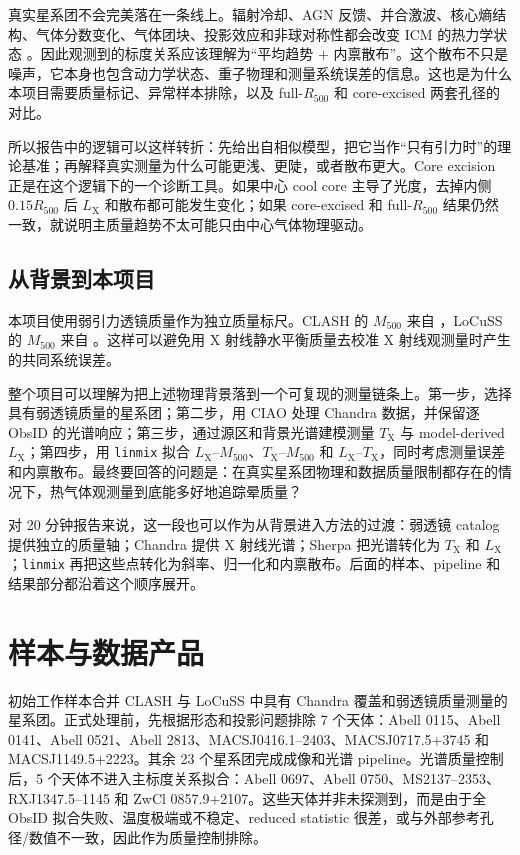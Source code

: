 \documentclass[UTF8,11pt,fontset=none]{ctexart}
\newcommand{\Mfive}{\ensuremath{M_{500}}}
\newcommand{\Rfive}{\ensuremath{R_{500}}}
\newcommand{\Lx}{\ensuremath{L_{\mathrm{X}}}}
\newcommand{\Tx}{\ensuremath{T_{\mathrm{X}}}}
\begin{document}
真实星系团不会完美落在一条线上。辐射冷却、AGN 反馈、并合激波、核心熵结构、气体分数变化、气体团块、投影效应和非球对称性都会改变 ICM 的热力学状态 \citep{pratt2009,mantz2010,maughan2012}。因此观测到的标度关系应该理解为“平均趋势 + 内禀散布”。这个散布不只是噪声，它本身也包含动力学状态、重子物理和测量系统误差的信息。这也是为什么本项目需要质量标记、异常样本排除，以及 full-\Rfive{} 和 core-excised 两套孔径的对比。

所以报告中的逻辑可以这样转折：先给出自相似模型，把它当作“只有引力时”的理论基准；再解释真实测量为什么可能更浅、更陡，或者散布更大。Core excision 正是在这个逻辑下的一个诊断工具。如果中心 cool core 主导了光度，去掉内侧 $0.15\Rfive$ 后 \Lx{} 和散布都可能发生变化；如果 core-excised 和 full-\Rfive{} 结果仍然一致，就说明主质量趋势不太可能只由中心气体物理驱动。

\subsection{从背景到本项目}

本项目使用弱引力透镜质量作为独立质量标尺。CLASH 的 \Mfive{} 来自 \citet{umetsu2016}，LoCuSS 的 \Mfive{} 来自 \citet{okabe2016}。这样可以避免用 X 射线静水平衡质量去校准 X 射线观测量时产生的共同系统误差。

整个项目可以理解为把上述物理背景落到一个可复现的测量链条上。第一步，选择具有弱透镜质量的星系团；第二步，用 CIAO 处理 Chandra 数据，并保留逐 ObsID 的光谱响应；第三步，通过源区和背景光谱建模测量 \Tx{} 与 model-derived \Lx{}；第四步，用 \texttt{linmix} 拟合 \Lx--\Mfive{}、\Tx--\Mfive{} 和 \Lx--\Tx{}，同时考虑测量误差和内禀散布。最终要回答的问题是：在真实星系团物理和数据质量限制都存在的情况下，热气体观测量到底能多好地追踪晕质量？

对 20 分钟报告来说，这一段也可以作为从背景进入方法的过渡：弱透镜 catalog 提供独立的质量轴；Chandra 提供 X 射线光谱；Sherpa 把光谱转化为 \Tx{} 和 \Lx{}；\texttt{linmix} 再把这些点转化为斜率、归一化和内禀散布。后面的样本、pipeline 和结果部分都沿着这个顺序展开。

\section{样本与数据产品}

初始工作样本合并 CLASH 与 LoCuSS 中具有 Chandra 覆盖和弱透镜质量测量的星系团。正式处理前，先根据形态和投影问题排除 7 个天体：Abell 0115、Abell 0141、Abell 0521、Abell 2813、MACSJ0416.1--2403、MACSJ0717.5+3745 和 MACSJ1149.5+2223。其余 23 个星系团完成成像和光谱 pipeline。光谱质量控制后，5 个天体不进入主标度关系拟合：Abell 0697、Abell 0750、MS2137--2353、RXJ1347.5--1145 和 ZwCl 0857.9+2107。这些天体并非未探测到，而是由于全 ObsID 拟合失败、温度极端或不稳定、reduced statistic 很差，或与外部参考孔径/数值不一致，因此作为质量控制排除。
\end{document}
